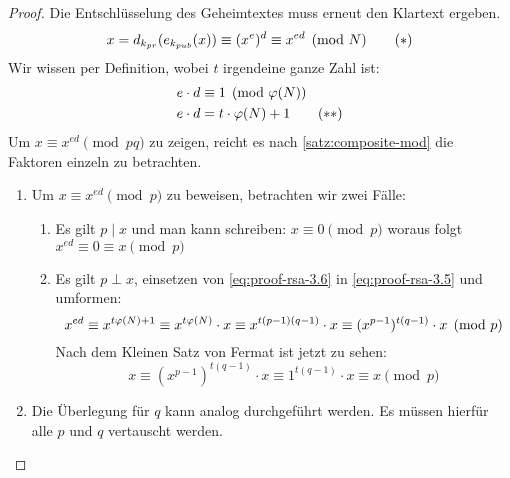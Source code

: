 \begin{proof}
  Die Entschlüsselung des Geheimtextes muss erneut den Klartext ergeben.
  \begin{equation}
    \label{eq:proof-rsa-3.5}
    x = d_{k_{pr}}(e_{k_{pub}}(x)) \equiv (x^e)^d \equiv x^{ed} \pmod{N} \tag{$*$}
  \end{equation}
  Wir wissen per Definition, wobei $t$ irgendeine ganze Zahl ist:
  \begin{align}
    e \cdot d & \equiv 1 \pmod{\varphi(N)} \notag   \\
    \label{eq:proof-rsa-3.6}
    e \cdot d & = t \cdot \varphi(N) + 1 \tag{$**$}
  \end{align}
  Um $x \equiv x^{ed} \pmod{pq}$ zu zeigen, reicht es nach \autoref{satz:composite-mod}
  die Faktoren einzeln zu betrachten.
  \begin{enumerate}
    \item Um $x \equiv x^{ed} \pmod{p}$ zu beweisen, betrachten wir zwei Fälle:
          \begin{enumerate}[topsep=0pt]
            \item Es gilt $p \mid x$ und man kann schreiben:
                  $x \equiv 0 \pmod{p}$ woraus folgt $x^{ed} \equiv 0 \equiv x \pmod{p}$
            \item Es gilt $p \perp x$, einsetzen von \eqref{eq:proof-rsa-3.6} in
                  \eqref{eq:proof-rsa-3.5}
                  und umformen:
                  \begin{equation*}
                    x^{ed} \equiv x^{t\varphi(N) + 1} \equiv
                    x^{t\varphi(N)} \cdot x \equiv
                    x^{t(p - 1)(q - 1)} \cdot x \equiv
                    (x^{p - 1})^{t(q - 1)} \cdot x \pmod{p}
                  \end{equation*}
                  Nach dem Kleinen Satz von Fermat ist jetzt zu sehen:
                  \begin{equation*}
                    x \equiv (x^{p - 1})^{t(q - 1)} \cdot x \equiv
                    1^{t(q - 1)} \cdot x \equiv x \pmod{p}
                  \end{equation*}
          \end{enumerate}
    \item Die Überlegung für $q$ kann analog durchgeführt werden. Es müssen hierfür
          alle $p$ und $q$ vertauscht werden. \qedhere
  \end{enumerate}
\end{proof}

